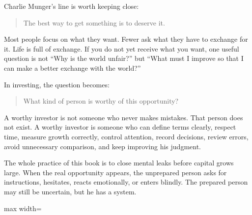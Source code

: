 Charlie Munger's line is worth keeping close:

\begin{quote}
The best way to get something is to deserve it.
\end{quote}

Most people focus on what they want. Fewer ask what they have to exchange for it. Life is full of exchange. If you do not yet receive what you want, one useful question is not ``Why is the world unfair?'' but ``What must I improve so that I can make a better exchange with the world?''

In investing, the question becomes:

\begin{quote}
What kind of person is worthy of this opportunity?
\end{quote}

A worthy investor is not someone who never makes mistakes. That person does not exist. A worthy investor is someone who can define terms clearly, respect time, measure growth correctly, control attention, record decisions, review errors, avoid unnecessary comparison, and keep improving his judgment.

The whole practice of this book is to close mental leaks before capital grows large. When the real opportunity appears, the unprepared person asks for instructions, hesitates, reacts emotionally, or enters blindly. The prepared person may still be uncertain, but he has a system.

\begin{center}
\begin{adjustbox}{max width=\linewidth}
\end{adjustbox}
\end{center}

